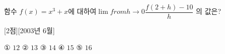 함수 $f(x)=x^{3}+x $에 대하여$\lim from h\to 0\dfrac{f(2+h)-10}{h}$
의 값은? 

[2점][2003년 6월]

① $12
$ ② $13
$ ③ $14
$ ④ $15
$ ⑤ $16
$ 

\vfill{}
\rule{0pt}{1mm}
